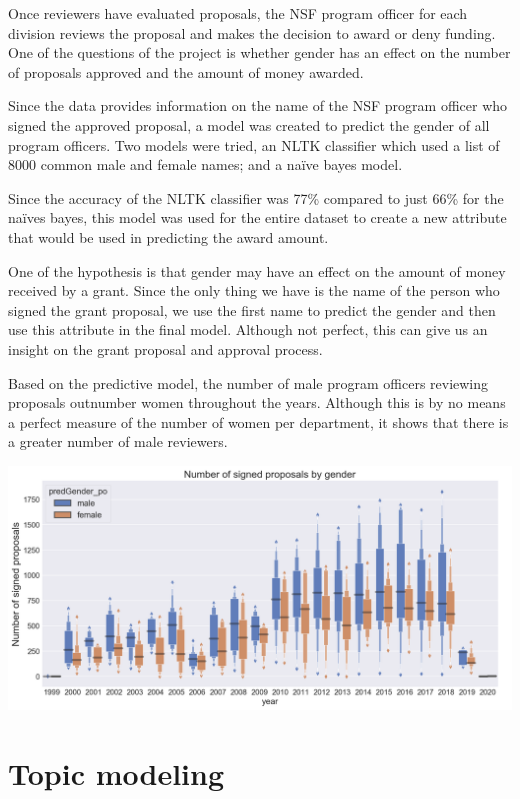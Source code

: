 \documentclass[11pt, oneside]{article}   	%
\begin{document}
Once reviewers have evaluated proposals, the NSF program officer for each division reviews the proposal and makes the decision to award or deny funding. One of the questions of the project is whether gender has an effect on the number of proposals approved and the amount of money awarded.
 
Since the data provides information on the name of the NSF program officer who signed the approved proposal, a model was created to predict the gender of all program officers. Two models were tried, an NLTK classifier which used a list of 8000 common male and female names; and a naïve bayes model. 
 
Since the accuracy of the NLTK classifier was  77\% compared to just 66\% for the naïves bayes, this model was used for the entire dataset to create a new attribute that would be used in predicting the award amount.
 
One of the hypothesis is that gender may have an effect on the amount of money received by a grant. Since the only thing we have is the name of the person who signed the grant proposal, we use the first name to predict the gender and then use this attribute in the final model. Although not perfect, this can give us an insight on the grant proposal and approval process.
 
Based on the predictive model, the number of male program officers reviewing proposals outnumber women throughout the years. Although this is by no means a perfect measure of the number of women per department, it shows that there is a greater number of male reviewers. 

\includegraphics[width=\textwidth]{programofficergender}

 \section{{Topic modeling} }
 
\end{document}
